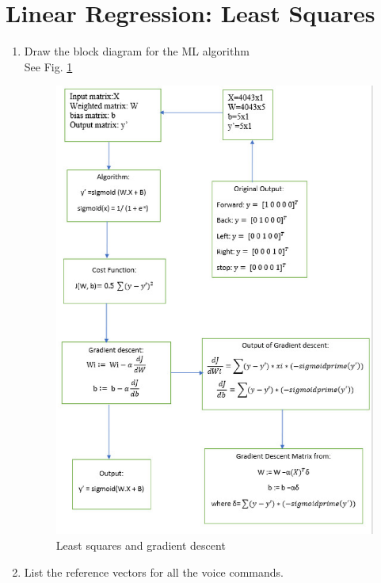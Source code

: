 \documentclass[journal,12pt,twocolumn]{IEEEtran}
\renewcommand\thesection{\arabic{section}}
\begin{document}
\section{Linear Regression: Least Squares}
\begin{enumerate}[label=\thesection.\arabic*
,ref=\thesection.\theenumi]
\item Draw the block diagram for the ML algorithm
\\
\solution See Fig. \ref{fig:algo}
\begin{figure}[ht!]
\begin{center}
\includegraphics[width=\columnwidth]{./figs/algo.eps}
\end{center}
\caption{Least squares and gradient descent}
\label{fig:algo}
\end{figure}
\item List the reference vectors for all the voice commands.

\end{enumerate}
\end{document}
